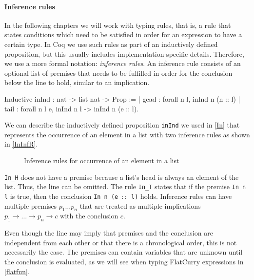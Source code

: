 \documentclass[paper = a4, fleqn, twoside]{scrreprt}
\newcommand{\coqinline}[1]{\texttt{#1}}
\begin{document}
\paragraph{Inference rules}
In the following chapters we will work with typing rules, that is, a rule that states conditions which need to be satisfied in order for an expression to have a certain type. In Coq we use such rules as part of an inductively defined proposition, but this usually includes implementation-specific details. Therefore, we use a more formal notation: \textit{inference rules}.\label{infrules} An inference rule consists of an optional list of premises that needs to be fulfilled in order for the conclusion below the line to hold, similar to an implication.
\begin{coqcode}
Inductive inInd : nat -> list nat -> Prop :=
  | gead : forall n l, inInd n (n :: l)
  | tail : forall n l e, inInd n l -> inInd n (e :: l).
\end{coqcode}
We can describe the inductively defined proposition \coqinline{inInd} we used in \autoref{In} that represents the occurrence of an element in a list with two inference rules as shown in \autoref{InInfR}.
\begin{figure}[H]
	\begin{center}
		\begin{minipage}{.45 \linewidth}
			\infer[\text{\texttt{In\_H}}]{\coqinline{In n (n :: l)}}{\phantom{premise}}
		\end{minipage}
		\hspace{.1 \linewidth}
		\begin{minipage}{.45 \linewidth}
			\infer[\text{\texttt{In\_T}}]{\coqinline{In n (e :: l)}}{\coqinline{In n l}}
		\end{minipage}
	\end{center}
	\caption{Inference rules for occurrence of an element in a list}
	\label{InInfR}
\end{figure} \noindent
\texttt{In\_H} does not have a premise because a list's head is always an element of the list. Thus, the line can be omitted. The rule \texttt{In\_T} states that if the premise \texttt{In n l} is true, then the conclusion \texttt{In n (e $::$ l)} holds.
Inference rules can have multiple premises $p_1 \dots p_n$ that are treated as multiple implications $p_1 \rightarrow \dots \rightarrow p_n \rightarrow c$ with the conclusion $c$.\\
\par \noindent
Even though the line may imply that premises and the conclusion are independent from each other or that there is a chronological order, this is not necessarily the case. The premises can contain variables that are unknown until the conclusion is evaluated, as we will see when typing FlatCurry expressions in \autoref{flatfun}.
\end{document}
